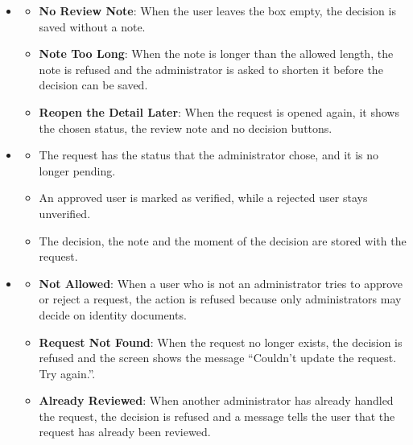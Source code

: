 \begin{itemize}[leftmargin=1.6em,topsep=4pt,itemsep=3pt,parsep=0pt,label=$\bullet$]
\begin{itemize}[leftmargin=2.2em,topsep=2pt,itemsep=3pt,parsep=0pt,label=$\circ$]
\begin{itemize}[leftmargin=2.2em,topsep=2pt,itemsep=3pt,parsep=0pt,label=$\blacksquare$]
                \end{itemize}
            \item \textbf{See the Result}: When the decision is saved, the status badge of the request changes and the decision buttons disappear, so the request is now read-only.
        \end{itemize}
    \item {}
        \begin{itemize}[leftmargin=2.2em,topsep=2pt,itemsep=3pt,parsep=0pt,label=$\circ$]
            \item \textbf{No Review Note}: When the user leaves the box empty, the decision is saved without a note.
            \item \textbf{Note Too Long}: When the note is longer than the allowed length, the note is refused and the administrator is asked to shorten it before the decision can be saved.
            \item \textbf{Reopen the Detail Later}: When the request is opened again, it shows the chosen status, the review note and no decision buttons.
        \end{itemize}
    \item {}
        \begin{itemize}[leftmargin=2.2em,topsep=2pt,itemsep=3pt,parsep=0pt,label=$\circ$]
            \item The request has the status that the administrator chose, and it is no longer pending.
            \item An approved user is marked as verified, while a rejected user stays unverified.
            \item The decision, the note and the moment of the decision are stored with the request.
        \end{itemize}
    \item {}
        \begin{itemize}[leftmargin=2.2em,topsep=2pt,itemsep=3pt,parsep=0pt,label=$\circ$]
            \item \textbf{Not Allowed}: When a user who is not an administrator tries to approve or reject a request, the action is refused because only administrators may decide on identity documents.
            \item \textbf{Request Not Found}: When the request no longer exists, the decision is refused and the screen shows the message ``Couldn't update the request. Try again.''.
            \item \textbf{Already Reviewed}: When another administrator has already handled the request, the decision is refused and a message tells the user that the request has already been reviewed.

\end{itemize}
\end{itemize}

